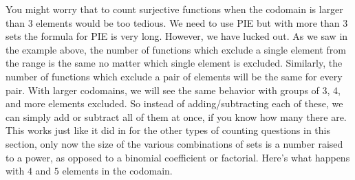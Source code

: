 \documentclass[10pt,]{book}
\theoremstyle{plain}
\theoremstyle{definition}
\theoremstyle{definition}
\theoremstyle{definition}
\theoremstyle{definition}
\numberwithin{equation}{chapter}
\begin{document}
\hypertarget{p-1006}{}%
You might worry that to count surjective functions when the codomain is larger than 3 elements would be too tedious. We need to use PIE but with more than 3 sets the formula for PIE is very long. However, we have lucked out. As we saw in the example above, the number of functions which exclude a single element from the range is the same no matter which single element is excluded. Similarly, the number of functions which exclude a pair of elements will be the same for every pair. With larger codomains, we will see the same behavior with groups of 3, 4, and more elements excluded. So instead of adding/subtracting each of these, we can simply add or subtract all of them at once, if you know how many there are. This works just like it did in for the other types of counting questions in this section, only now the size of the various combinations of sets is a number raised to a power, as opposed to a binomial coefficient or factorial. Here's what happens with \(4\) and \(5\) elements in the codomain.%
\end{document}
